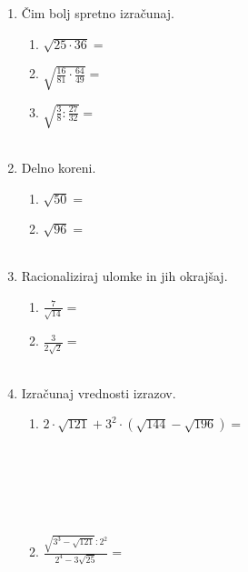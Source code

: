 \documentclass[12pt,a4paper]{article}
\begin{document}
\begin{enumerate}[resume]

    \item Čim bolj spretno izračunaj.
    \begin{enumerate}
        \item $\sqrt{25\cdot 36}=$ \\
        \item $\sqrt{\frac{16}{81}\cdot\frac{64}{49}}=$ \\
        \item $\sqrt{\frac{3}{8}:\frac{27}{32}}=$ \\ \\
    \end{enumerate}

    \item Delno koreni.
    \begin{enumerate}
        \item $\sqrt{50}=$ \\
        \item $\sqrt{96}=$ \\ \\
    \end{enumerate}

    \item Racionaliziraj ulomke in jih okrajšaj.
    \begin{enumerate}
        \item $\frac{7}{\sqrt{14}}=$ \\
        \item $\frac{3}{2\sqrt{2}}=$ \\ \\
    \end{enumerate}

    \item Izračunaj vrednosti izrazov.
    \begin{enumerate}
        \item $2\cdot\sqrt{121}+3^2\cdot\left(\sqrt{144}-\sqrt{196}\right)=$ \\ \\ \\ \\ \\ \\
        \item $\frac{\sqrt{3^3-\sqrt{121}}:2^2}{2^4-3\sqrt{25}}=$ \\ \\ \\ \\ \\
    \end{enumerate}

\end{enumerate}
\end{document}
